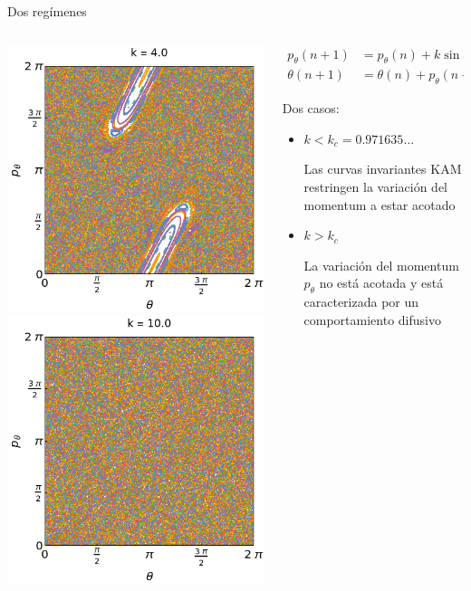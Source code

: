 \documentclass[aspectratio=169,xcolor=dvipsnames,7pt]{beamer}
\begin{document}
\begin{frame}[t]{Dos regímenes}
\begin{columns}
\begin{column}{0.39\textwidth}
			\includegraphics[width=.4\textwidth]{k_4_0.png}
			\includegraphics[width=.4\textwidth]{k_10_0.png}
		\end{column}	
		\begin{column}{0.59\textwidth}
			\begin{align*}
				p_\theta(n+1) &= p_\theta(n) + k\sin\theta(n)\mod{(2\pi)} \\
				\theta(n+1) &= \theta(n) + p_\theta(n+1)\mod{(2\pi)}
			\end{align*}
			
			Dos casos:
			\begin{itemize} 
				\item $k<k_c=0.971635\ldots$
				
				Las curvas
				invariantes KAM restringen la variación del momentum a estar acotado
				\item $k>k_c$ 
				
				La variación del momentum $p_\theta$ no está acotada y está 
				caracterizada por un comportamiento difusivo 
			\end{itemize}
		\end{column}
	\end{columns}
\end{frame}
\end{document}
